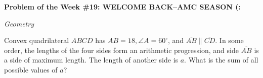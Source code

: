 \begin{potw}\vspace{5pt}
{\large\textbf{Problem of the Week \#19: WELCOME BACK--AMC SEASON (:}}\vspace{5pt}

\textit{Geometry}\V

Convex quadrilateral $ABCD$ has $AB = 18, \angle{A} = 60^{\circ}$, and $\overline{AB} \parallel \overline{CD}$. In some order, the lengths of the four sides form an arithmetic progression, and side $\overline{AB}$ is a side of maximum length. The length of another side is $a$. What is the sum of all possible values of $a$?
\end{potw}\V
